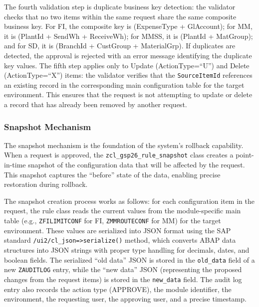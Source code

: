 \documentclass[12pt,a4paper]{report}
\begin{document}
The fourth validation step is duplicate business key detection: the validator checks that no two items within the same request share the same composite business key. For FI, the composite key is (ExpenseType + GlAccount); for MM, it is (PlantId + SendWh + ReceiveWh); for MMSS, it is (PlantId + MatGroup); and for SD, it is (BranchId + CustGroup + MaterialGrp). If duplicates are detected, the approval is rejected with an error message identifying the duplicate key values. The fifth step applies only to Update (ActionType=``U'') and Delete (ActionType=``X'') items: the validator verifies that the \texttt{SourceItemId} references an existing record in the corresponding main configuration table for the target environment. This ensures that the request is not attempting to update or delete a record that has already been removed by another request.

\subsubsection{Snapshot Mechanism}

The snapshot mechanism is the foundation of the system's rollback capability. When a request is approved, the \texttt{zcl\_gsp26\_rule\_snapshot} class creates a point-in-time snapshot of the configuration data that will be affected by the request. This snapshot captures the ``before'' state of the data, enabling precise restoration during rollback.

The snapshot creation process works as follows: for each configuration item in the request, the rule class reads the current values from the module-specific main table (e.g., \texttt{ZFILIMITCONF} for FI, \texttt{ZMMROUTECONF} for MM) for the target environment. These values are serialized into JSON format using the SAP standard \texttt{/ui2/cl\_json=>serialize()} method, which converts ABAP data structures into JSON strings with proper type handling for decimals, dates, and boolean fields. The serialized ``old data'' JSON is stored in the \texttt{old\_data} field of a new \texttt{ZAUDITLOG} entry, while the ``new data'' JSON (representing the proposed changes from the request items) is stored in the \texttt{new\_data} field. The audit log entry also records the action type (APPROVE), the module identifier, the environment, the requesting user, the approving user, and a precise timestamp.
\end{document}
